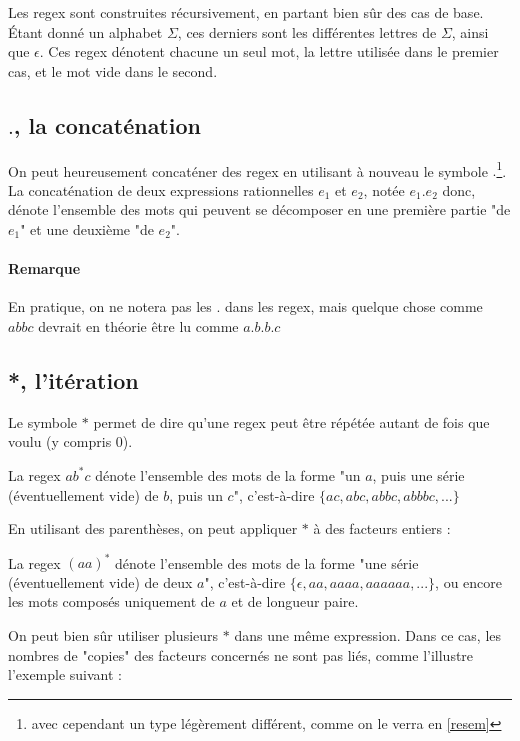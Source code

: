 Les regex sont construites récursivement, en partant bien sûr des cas de base. Étant donné un alphabet $\Sigma$, ces derniers sont les différentes lettres de $\Sigma$, ainsi que $\epsilon$. Ces regex dénotent chacune un seul mot, la lettre utilisée dans le premier cas, et le mot vide dans le second.

\subsection{$.$, la concaténation}

On peut heureusement concaténer des regex en utilisant à nouveau le symbole $.$\footnote{avec cependant un type légèrement différent, comme on le verra en \ref{resem}}. La concaténation de deux expressions rationnelles $e_1$ et $e_2$, notée $e_1.e_2$ donc, dénote l'ensemble des mots qui peuvent se décomposer en une première partie "de $e_1$" et une deuxième "de $e_2$".

\paragraph{Remarque} En pratique, on ne notera pas les $.$ dans les regex, mais quelque chose comme $abbc$ devrait en théorie être lu comme $a.b.b.c$

\subsection{*, l'itération}

Le symbole $*$ permet de dire qu'une regex peut être répétée autant de fois que voulu (y compris 0). 

\begin{example}
La regex $ab^*c$ dénote l'ensemble des mots de la forme "un $a$, puis une série (éventuellement vide) de $b$, puis un $c$", c'est-à-dire $\{ac, abc, abbc, abbbc, ...\}$
\end{example}

En utilisant des parenthèses, on peut appliquer $*$ à des facteurs entiers :

\begin{example}
La regex $(aa)^*$ dénote l'ensemble des mots de la forme "une série (éventuellement vide) de deux $a$", c'est-à-dire $\{\epsilon, aa, aaaa, aaaaaa, ...\}$, ou encore les mots composés uniquement de $a$ et de longueur paire.
\end{example}

On peut bien sûr utiliser plusieurs $*$ dans une même expression. Dans ce cas, les nombres de "copies" des facteurs concernés ne sont pas liés, comme l'illustre l'exemple suivant :

